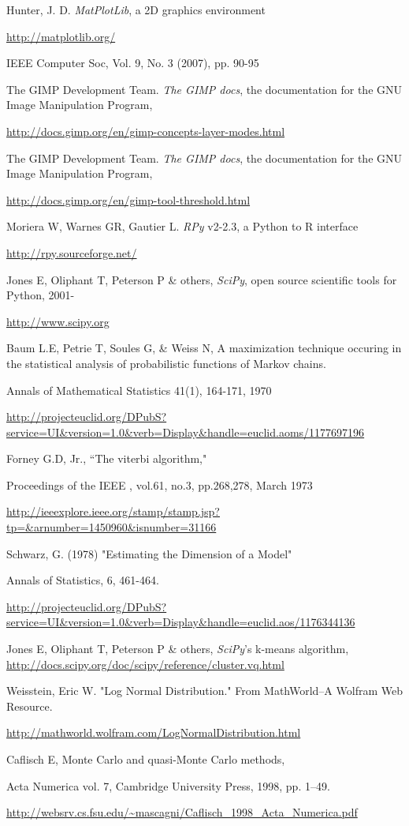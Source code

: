 \documentclass{report}
\begin{document}
\begin{thebibliography}{9}
	Hunter, J. D. \emph{MatPlotLib}, a 2D graphics environment 

	\url{http://matplotlib.org/}

	IEEE Computer Soc, Vol. 9, No. 3 (2007), pp. 90-95

 The GIMP Development Team. \emph{The GIMP docs}, the documentation for the GNU Image Manipulation Program, 

\url{http://docs.gimp.org/en/gimp-concepts-layer-modes.html}

 The GIMP Development Team. \emph{The GIMP docs}, the documentation for the GNU Image Manipulation Program, 

\url{http://docs.gimp.org/en/gimp-tool-threshold.html}

 Moriera W, Warnes GR, Gautier L. \emph{RPy} v2-2.3, a Python to R interface

\url{http://rpy.sourceforge.net/}

 Jones E, Oliphant T, Peterson P \& others, \emph{SciPy}, open source scientific tools for Python, 2001-

\url{http://www.scipy.org}

 Baum L.E, Petrie T, Soules G, \& Weiss N, A maximization technique occuring in the statistical analysis of probabilistic functions of Markov chains.

Annals of Mathematical Statistics 41(1), 164-171, 1970

\url{http://projecteuclid.org/DPubS?service=UI&version=1.0&verb=Display&handle=euclid.aoms/1177697196}

 Forney G.D, Jr., ``The viterbi algorithm,"

Proceedings of the IEEE , vol.61, no.3, pp.268,278, March 1973

\url{http://ieeexplore.ieee.org/stamp/stamp.jsp?tp=&arnumber=1450960&isnumber=31166}

 Schwarz, G. (1978) "Estimating the Dimension of a Model"

Annals of Statistics, 6, 461-464.

\url{http://projecteuclid.org/DPubS?service=UI&version=1.0&verb=Display&handle=euclid.aos/1176344136}

 Jones E, Oliphant T, Peterson P \& others, \emph{SciPy}'s k-means algorithm, \url{http://docs.scipy.org/doc/scipy/reference/cluster.vq.html}

 Weisstein, Eric W. "Log Normal Distribution." From MathWorld--A Wolfram Web Resource.

\url{http://mathworld.wolfram.com/LogNormalDistribution.html}

 Caflisch E, Monte Carlo and quasi-Monte Carlo methods,

Acta Numerica vol. 7, Cambridge University Press, 1998, pp. 1–49.

\url{http://websrv.cs.fsu.edu/~mascagni/Caflisch_1998_Acta_Numerica.pdf}

\end{thebibliography}
\end{document}
